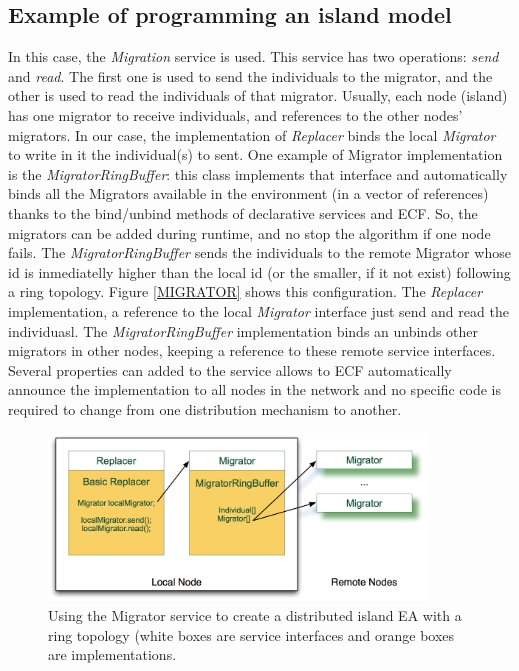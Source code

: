 \subsection{Example of programming an island model}
\label{subsec:migrator}
In this case, the {\em Migration} service is used. This service has two operations: {\em send} and {\em read}. The first one is used to send the individuals to the migrator, and the other is used to read the individuals of that migrator. Usually, each node (island) has one migrator to receive individuals, and references to the other nodes' migrators. In our case, the implementation of {\em Replacer} binds the local {\em Migrator} to write in it the individual(s) to sent. One example of Migrator implementation is the {\em MigratorRingBuffer}: this class implements that interface and automatically binds all the Migrators available in the environment (in a vector of references) thanks to the bind/unbind methods of declarative services and ECF. So, the migrators can be added during runtime, and no stop the algorithm if one node fails.  The {\em MigratorRingBuffer} sends the individuals to the remote Migrator whose id is inmediatelly higher than the local id (or the smaller, if it not exist) following a ring topology. Figure \ref{MIGRATOR} shows this configuration. The {\em Replacer} implementation, a reference to the local {\em Migrator} interface just send and read the individuasl. The {\em MigratorRingBuffer} implementation binds an unbinds other migrators in other nodes, keeping a reference to these remote service interfaces. Several properties can added to the service allows to ECF automatically announce the implementation to all nodes in the network and no specific code is required to change from one distribution mechanism to another. 

\begin{figure}
\centering
\includegraphics[width=10cm]{gfx/osgiliath/migrator.png}


\caption{Using the Migrator service to create a distributed island EA with a ring topology (white boxes are service interfaces and orange boxes are implementations.}
\label{AXISFIGURE}
\end{figure}

